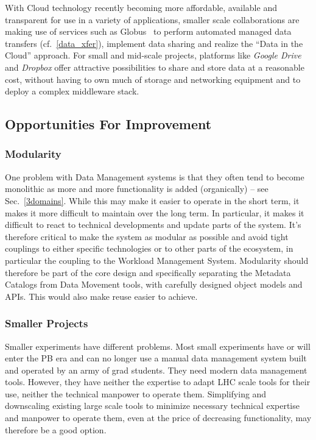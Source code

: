 With Cloud technology recently becoming more affordable, available and transparent for use in a variety of applications, smaller
scale collaborations are making use of services such as Globus~\cite{globus} to perform automated managed data transfers (cf.~\ref{data_xfer}),
implement data sharing and realize the ``Data in the Cloud'' approach. For small and mid-scale projects, platforms like \textit{Google Drive}
and \textit{Dropbox} offer attractive possibilities to share and store data at a reasonable cost, without having to own much of storage and
networking equipment and to deploy a complex middleware stack.





\subsection{Opportunities For Improvement}
\subsubsection{Modularity}
One problem with Data Management systems is that they often tend to become monolithic as more and more functionality is 
added (organically) -- see Sec.~\ref{3domains}. While this may make it easier to operate in the short term, it makes it more difficult to maintain over 
the long term. In particular, it makes it difficult to react to technical developments and update parts of the system. It's 
therefore critical to make the system as modular as possible and avoid tight couplings to either specific technologies or 
to other parts of the ecosystem, in particular the coupling to the Workload Management System. Modularity should therefore be 
part of the core design and specifically separating the Metadata Catalogs from Data Movement tools, with carefully designed
object models and APIs. This would also make reuse easier to achieve.

\subsubsection{Smaller Projects}
Smaller experiments have different problems. Most small experiments have or will enter the PB era and can no longer use a manual 
data management system built and operated by an army of grad students. They need modern data management tools. However, they have neither the 
expertise to adapt LHC scale tools for their use, neither the technical manpower to operate them. Simplifying and downscaling existing 
large scale tools to minimize necessary technical expertise and manpower to operate them, even at the price of decreasing functionality, 
may therefore be a good option.


